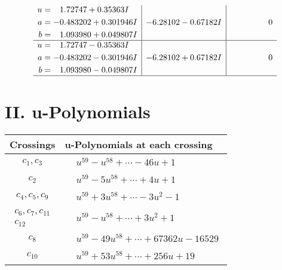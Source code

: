 \documentclass[1p]{elsarticle_modified}
\theoremstyle{definition}
\begin{document}
$$\begin{array}{c|c|c}
\begin{aligned}
u &= \phantom{-}1.72747 + 0.35363 I \\
a &= -0.483202 + 0.301946 I \\
b &= \phantom{-}1.093980 + 0.049807 I\end{aligned}
 & -6.28102 - 0.67182 I & \phantom{-0.000000 } 0 \\ \hline\begin{aligned}
u &= \phantom{-}1.72747 - 0.35363 I \\
a &= -0.483202 - 0.301946 I \\
b &= \phantom{-}1.093980 - 0.049807 I\end{aligned}
 & -6.28102 + 0.67182 I & \phantom{-0.000000 } 0\\
 \hline 
 \end{array}$$\newpage
\newpage\renewcommand{\arraystretch}{1}
\centering \section*{ II. u-Polynomials}
\begin{tabular}{m{50pt}|m{274pt}}
Crossings & \hspace{64pt}u-Polynomials at each crossing \\
\hline $$\begin{aligned}c_{1},c_{3}\end{aligned}$$&$\begin{aligned}
&u^{59}- u^{58}+\cdots-46 u+1
\end{aligned}$\\
\hline $$\begin{aligned}c_{2}\end{aligned}$$&$\begin{aligned}
&u^{59}-5 u^{58}+\cdots+4 u+1
\end{aligned}$\\
\hline $$\begin{aligned}c_{4},c_{5},c_{9}\end{aligned}$$&$\begin{aligned}
&u^{59}+3 u^{58}+\cdots-3 u^2-1
\end{aligned}$\\
\hline $$\begin{aligned}c_{6},c_{7},c_{11}\\c_{12}\end{aligned}$$&$\begin{aligned}
&u^{59}- u^{58}+\cdots+3 u^2+1
\end{aligned}$\\
\hline $$\begin{aligned}c_{8}\end{aligned}$$&$\begin{aligned}
&u^{59}-49 u^{58}+\cdots+67362 u-16529
\end{aligned}$\\
\hline $$\begin{aligned}c_{10}\end{aligned}$$&$\begin{aligned}
&u^{59}+53 u^{58}+\cdots+256 u+19
\end{aligned}$\\
\hline
\end{tabular}\newpage\renewcommand{\arraystretch}{1}
\end{document}
